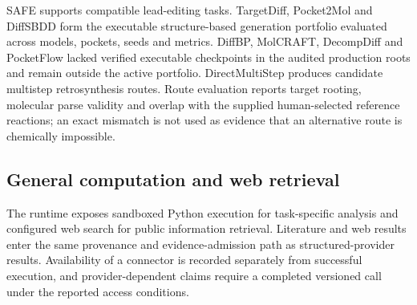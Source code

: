 \documentclass{article}
\begin{document}
SAFE supports compatible lead-editing tasks. TargetDiff, Pocket2Mol and DiffSBDD form the executable structure-based generation portfolio evaluated across models, pockets, seeds and metrics. DiffBP, MolCRAFT, DecompDiff and PocketFlow lacked verified executable checkpoints in the audited production roots and remain outside the active portfolio. DirectMultiStep produces candidate multistep retrosynthesis routes. Route evaluation reports target rooting, molecular parse validity and overlap with the supplied human-selected reference reactions; an exact mismatch is not used as evidence that an alternative route is chemically impossible.

\subsection{General computation and web retrieval}

The runtime exposes sandboxed Python execution for task-specific analysis and configured web search for public information retrieval. Literature and web results enter the same provenance and evidence-admission path as structured-provider results. Availability of a connector is recorded separately from successful execution, and provider-dependent claims require a completed versioned call under the reported access conditions.

\clearpage
\end{document}
